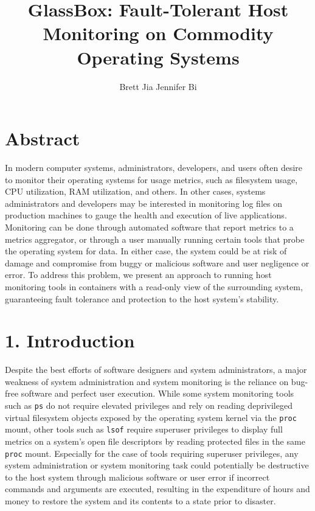 \documentclass{proc}
\begin{document}
\title{GlassBox: Fault-Tolerant Host Monitoring on Commodity Operating Systems}

\author{Brett Jia \hspace{1em} Jennifer Bi}

\maketitle

\section*{Abstract}

In modern computer systems, administrators, developers, and users often desire to monitor their operating systems for usage metrics, such as filesystem usage, CPU utilization, RAM utilization, and others. In other cases, systems administrators and developers may be interested in monitoring log files on production machines to gauge the health and execution of live applications. Monitoring can be done through automated software that report metrics to a metrics aggregator, or through a user manually running certain tools that probe the operating system for data. In either case, the system could be at risk of damage and compromise from buggy or malicious software and user negligence or error. To address this problem, we present an approach to running host monitoring tools in containers with a read-only view of the surrounding system, guaranteeing fault tolerance and protection to the host system's stability.

\section*{1. Introduction}

Despite the best efforts of software designers and system administrators, a major weakness of system administration and system monitoring is the reliance on bug-free software and perfect user execution. While some system monitoring tools such as \texttt{ps} do not require elevated privileges and rely on reading deprivileged virtual filesystem objects exposed by the operating system kernel via the \texttt{proc} mount, other tools such as \texttt{lsof} require superuser privileges to display full metrics on a system's open file descriptors by reading protected files in the same \texttt{proc} mount. Especially for the case of tools requiring superuser privileges, any system administration or system monitoring task could potentially be destructive to the host system through malicious software or user error if incorrect commands and arguments are executed, resulting in the expenditure of hours and money to restore the system and its contents to a state prior to disaster.
\end{document}
